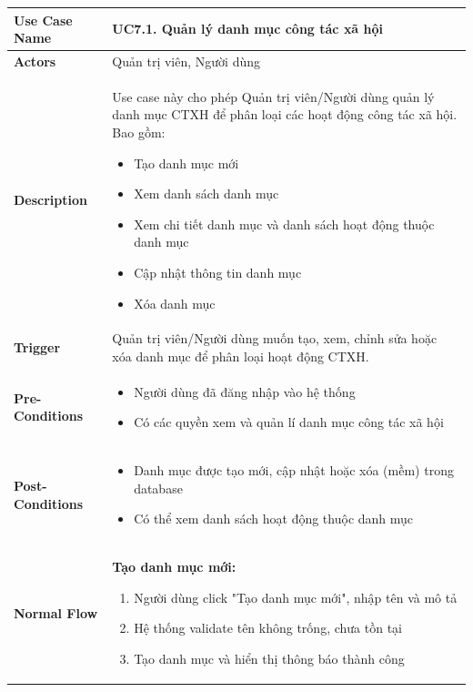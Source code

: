     \newpage
    \begin{table}[H]
    \renewcommand{\arraystretch}{1.3}
    \begin{tabular}{|m{}|m{}|}
    \hline
    \textbf{Use Case Name} 
    & \textbf{UC7.1. Quản lý danh mục công tác xã hội} \\ \hline

\textbf{Actors} 
& Quản trị viên, Người dùng \\ \hline

\textbf{Description}
    & Use case này cho phép Quản trị viên/Người dùng quản lý danh mục CTXH để phân loại các hoạt động công tác xã hội. Bao gồm:
    \begin{itemize}
        \item Tạo danh mục mới
        \item Xem danh sách danh mục
        \item Xem chi tiết danh mục và danh sách hoạt động thuộc danh mục
        \item Cập nhật thông tin danh mục
        \item Xóa danh mục
    \end{itemize}
    \\ \hline

    \textbf{Trigger} 
    & Quản trị viên/Người dùng muốn tạo, xem, chỉnh sửa hoặc xóa danh mục để phân loại hoạt động CTXH.
    \\ \hline

    \textbf{Pre-Conditions} 
    & \begin{itemize}
        \item Người dùng đã đăng nhập vào hệ thống
        \item Có các quyền xem và quản lí danh mục công tác xã hội
    \end{itemize}
    \\ \hline

    \textbf{Post-Conditions} 
    & \begin{itemize}
        \item Danh mục được tạo mới, cập nhật hoặc xóa (mềm) trong database
        \item Có thể xem danh sách hoạt động thuộc danh mục
    \end{itemize}
    \\ \hline

    \textbf{Normal Flow} 
    & \textbf{Tạo danh mục mới:}
    \begin{enumerate}
        \item Người dùng click "Tạo danh mục mới", nhập tên và mô tả
        \item Hệ thống validate tên không trống, chưa tồn tại
        \item Tạo danh mục và hiển thị thông báo thành công
    \end{enumerate}


\end{tabular}
\end{table}

